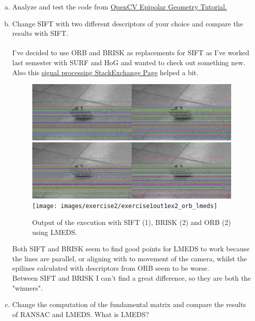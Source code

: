\documentclass[UTF-8]{article}
\begin{document}
	\begin{enumerate}[a.]
		\item Analyze  and  test  the  code  from \href{https://docs.opencv.org/4.x/da/de9/tutorial_py_epipolar_geometry.html}{OpenCV Epipolar Geometry Tutorial.}
		\item Change  SIFT  with  two  different  descriptors  of  your  choice  and  compare 
		the results with SIFT.\\\\
		I've decided to use ORB and BRISK as replacements for SIFT as I've worked last semester with SURF and HoG and wanted to check out something new. Also this \href{https://dsp.stackexchange.com/questions/1288/what-are-some-free-alternatives-to-sift-surf-that-can-be-used-in-commercial-app}{signal processing StackExchange Page} helped a bit.
		\begin{figure}[H]
			\centering
			\includegraphics[width=0.7\linewidth]{images/exercise2/exercise1out1ex2_sift_lmeds}
			\includegraphics[width=0.7\linewidth]{images/exercise2/exercise1out1ex2_brisk_lmeds}
			\texttt{[image: images/exercise2/exercise1out1ex2\_orb\_lmeds]}
			\caption{Output of the execution with SIFT (1), BRISK (2) and ORB (2) using LMEDS.}
			\label{fig:exercise1out1ex2lmeds}
		\end{figure}
		
		Both SIFT and BRISK seem to find good points for LMEDS to work because the lines are parallel, or aligning with to movement of the camera, whilst the epilines calculated with descriptors from ORB seem to be worse.\\
		Between SIFT and BRISK I can't find a great difference, so they are both the "winners".
		
		\item Change  the  computation  of  the  fundamental  matrix  and  compare  the 
		results of RANSAC and LMEDS. What is LMEDS?
		

\end{enumerate}
\end{document}
